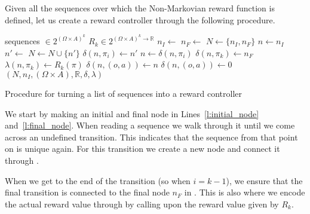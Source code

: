 Given all the sequences over which the Non-Markovian reward function is defined, let us create a reward controller through the following procedure.
\begin{algorithm}[H]
	\begin{algorithmic}[1]
		\Require sequences $\in 2^{(\Omega\times A)^k}$
		\Require $R_k \in 2^{(\Omega\times A)^k\to \mathbb{R}}$
		\State $n_I \gets $   \label{l:initial_node}
		\State $n_F \gets $   \label{l:final_node}
		\State $N\gets\{n_I,n_F\}$
			\State $n \gets n_I$
					\State $n'\gets$  
					\State $N \gets N \cup \{n'\}$		
					\State $\delta(n,\pi_i) \gets n'$	\label{l:set_transition}
				\EndIf 
				\State $n \gets \delta(n,\pi_i)$     
			\EndFor
			\State $\delta(n,\pi_k) \gets n_F$  \label{l:set_final_transition}
			\State $\lambda(n,\pi_k) \gets R_k(\pi)$  \label{l:set_reward}
		\EndFor
		 
				 
					\State $\delta(n,(o,a)) \gets n$ \label{l:self_loop}
				\EndIf
				 \label{l:set_zero}
					\State $\delta(n,(o,a)) \gets 0 $
				\EndIf
			\EndFor
		\EndFor
		\State \Return $(N,n_I,(\Omega\times A),\mathbb{R},\delta,\lambda)$
		\EndProcedure
	\end{algorithmic}
	\caption{Procedure for turning a list of sequences into a reward controller}
	\label{procedure:into_reward_controller}
\end{algorithm}

We start by making an initial and final node in Lines~\ref{l:initial_node} and~\ref{l:final_node}. When reading a sequence we walk through it until we come across an undefined transition. This indicates that the sequence from that point on is unique again. For this transition we create a new node and connect it through .

When we get to the end of the transition (so when $i=k-1$), we ensure that the final transition is connected to the final node $n_F$ in . This is also where we encode the actual reward value through  by calling upon the reward value given by $R_k$.

